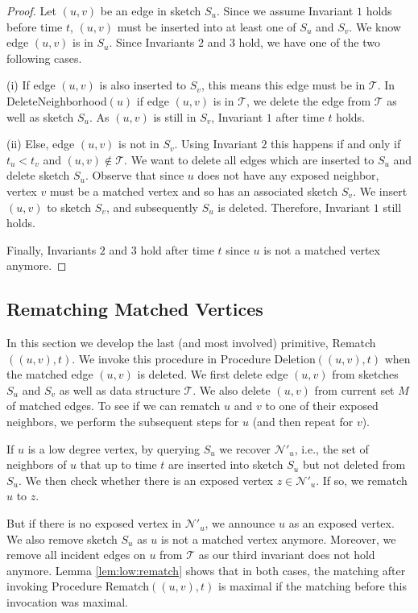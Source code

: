 \documentclass[11pt,letter]{article}
\begin{document}
\begin{proof}
Let $(u,v)$ be an edge in sketch $S_u$.
Since we assume Invariant $1$ holds before time $t$, $(u,v)$ must be
inserted into at least one of $S_u$ and $S_v$. We know edge $(u,v)$ is in $S_u$.
Since Invariants $2$ and $3$ hold, we have one of the two following cases.

(i) If edge $(u,v)$ is also inserted to $S_v$, this means this edge must be in $\mathcal{T}$.
In {\sf DeleteNeighborhood$(u)$} if edge $(u,v)$ is in $\mathcal{T}$,
we delete the edge from $\mathcal{T}$ as well as sketch $S_u$.
As $(u,v)$ is still in $S_v$, Invariant $1$ after time $t$ holds.

(ii) Else, edge $(u,v)$ is not in $S_v$. Using Invariant $2$ this happens
if and only if $t_u < t_v$ and $(u,v)\notin \mathcal{T}$.
We want to delete all edges which are inserted to $S_u$ and delete sketch $S_u$.
Observe that since $u$ does not have
any exposed neighbor, vertex $v$ must be a matched vertex and so has
an associated sketch $S_v$.
We insert $(u,v)$ to sketch $S_v$, and
subsequently $S_u$ is deleted.
Therefore, Invariant $1$ still holds.

Finally, Invariants $2$ and $3$ hold after time $t$ since $u$
is not a matched vertex anymore.
\end{proof}




\subsection{Rematching Matched Vertices}
In this section we develop the last (and most involved) primitive, {\sf Rematch$((u,v),t)$}.
We invoke this procedure in Procedure {\sf Deletion$((u,v), t)$} when the matched edge
$(u,v)$ is deleted. We first delete edge $(u,v)$ from sketches $S_u$ and $S_v$ as well as data structure $\mathcal{T}$.
We also delete $(u,v)$ from current set $M$ of matched edges.
To see if we can rematch $u$ and $v$ to one of their exposed neighbors,
we perform the subsequent steps for $u$ (and then repeat for $v$).

If $u$ is a low degree vertex, by querying $S_u$ we recover $\mathcal{N}'_u$, i.e.,
the set of neighbors of $u$ that up to time $t$
are inserted into sketch $S_u$ but not deleted from $S_u$.
We then check whether there is an exposed vertex
$z\in \mathcal{N}'_u$. If so, we rematch $u$ to $z$.

But if there is no exposed vertex in $\mathcal{N}'_u$,
we announce $u$ as an exposed vertex.
We also remove sketch $S_u$ as $u$ is not a matched vertex anymore. Moreover,
we remove all incident edges on $u$ from $\mathcal{T}$ as our third invariant
does not hold anymore. Lemma \ref{lem:low:rematch} shows that in both cases,
the matching after invoking Procedure {\sf Rematch$((u,v),t)$} is maximal
if the matching before this invocation was maximal.
\end{document}
